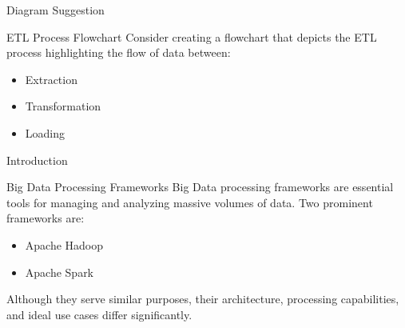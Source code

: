 \documentclass[aspectratio=169]{beamer}
\begin{document}
\begin{frame}{Diagram Suggestion}
    \begin{block}{ETL Process Flowchart}
        Consider creating a flowchart that depicts the ETL process highlighting the flow of data between:
        \begin{itemize}
            \item Extraction
            \item Transformation
            \item Loading
        \end{itemize}
    \end{block}
\end{frame}

\begin{frame}{Introduction}
    \begin{block}{Big Data Processing Frameworks}
        Big Data processing frameworks are essential tools for managing and analyzing massive volumes of data. Two prominent frameworks are:
        \begin{itemize}
            \item Apache Hadoop
            \item Apache Spark
        \end{itemize}
        Although they serve similar purposes, their architecture, processing capabilities, and ideal use cases differ significantly.
    \end{block}
\end{frame}
\end{document}
